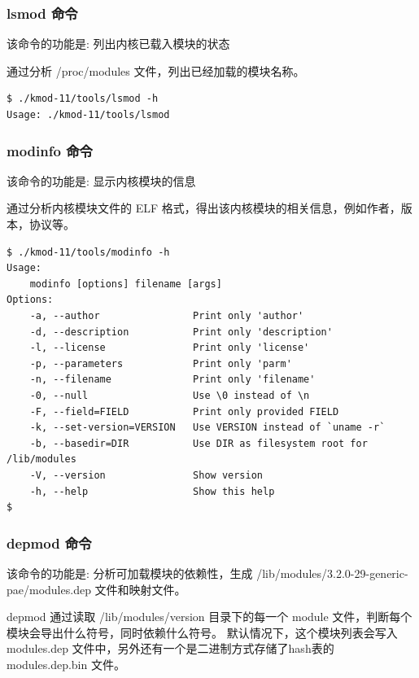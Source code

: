 \subsubsection{lsmod 命令}

该命令的功能是: 列出内核已载入模块的状态

通过分析 /proc/modules 文件，列出已经加载的模块名称。

{\begin{shaded}\begin{verbatim}
$ ./kmod-11/tools/lsmod -h
Usage: ./kmod-11/tools/lsmod
\end{verbatim}\end{shaded}}
\subsubsection{modinfo 命令}

该命令的功能是: 显示内核模块的信息

通过分析内核模块文件的 ELF
格式，得出该内核模块的相关信息，例如作者，版本，协议等。

{\begin{shaded}\begin{verbatim}
$ ./kmod-11/tools/modinfo -h
Usage:
    modinfo [options] filename [args]
Options:
    -a, --author                Print only 'author'
    -d, --description           Print only 'description'
    -l, --license               Print only 'license'
    -p, --parameters            Print only 'parm'
    -n, --filename              Print only 'filename'
    -0, --null                  Use \0 instead of \n
    -F, --field=FIELD           Print only provided FIELD
    -k, --set-version=VERSION   Use VERSION instead of `uname -r`
    -b, --basedir=DIR           Use DIR as filesystem root for /lib/modules
    -V, --version               Show version
    -h, --help                  Show this help
$ 
\end{verbatim}\end{shaded}}
\subsubsection{depmod 命令}

该命令的功能是: 分析可加载模块的依赖性，生成
/lib/modules/3.2.0-29-generic-pae/modules.dep 文件和映射文件。

depmod 通过读取 /lib/modules/version 目录下的每一个 module
文件，判断每个模块会导出什么符号，同时依赖什么符号。
默认情况下，这个模块列表会写入 modules.dep
文件中，另外还有一个是二进制方式存储了hash表的 modules.dep.bin 文件。

